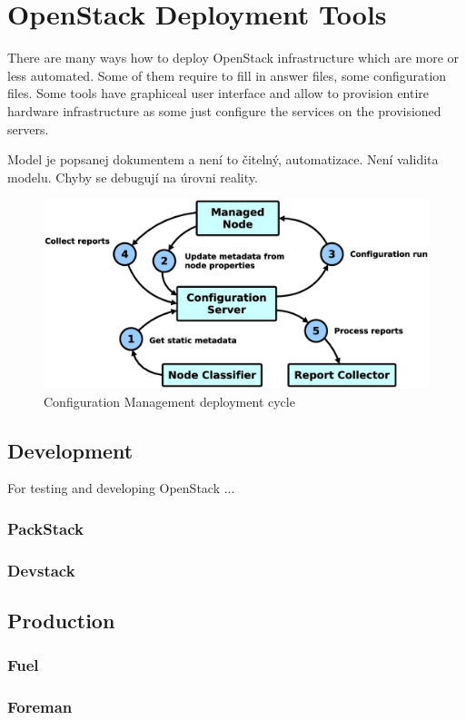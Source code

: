 
\section{OpenStack Deployment Tools}

There are many ways how to deploy OpenStack infrastructure which are more or less automated. Some of them require to fill in answer files, some configuration files. Some tools have graphiceal user interface and allow to provision entire hardware infrastructure as some just configure the services on the provisioned servers.

Model je popsanej dokumentem a není to čitelný, automatizace. Není validita modelu. Chyby se debugují na úrovni reality.

\begin{figure}[!h]
\centering
\includegraphics[scale=.15]{img/cm_cycle.eps}
\caption{Configuration Management deployment cycle}
\label{fig:cm}
\end{figure}


\subsection{Development}

For testing and developing OpenStack ...

\subsubsection{PackStack}

\subsubsection{Devstack}

\subsection{Production}

\subsubsection{Fuel}

\subsubsection{Foreman}

